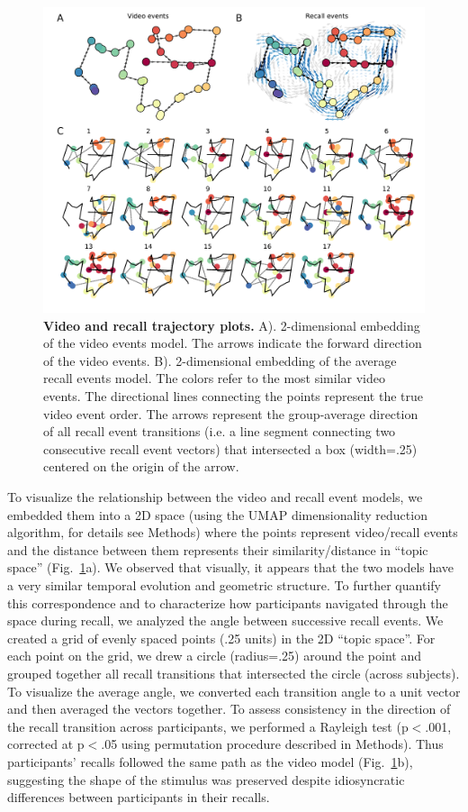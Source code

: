 \documentclass{article}
\begin{document}
{\begin{figure}[t!]
\centering
\includegraphics[width=1\textwidth]{figs/3_trajectory.pdf}
\caption{\small \textbf{Video and recall trajectory plots.} A). 2-dimensional embedding of the video events model. The arrows indicate the forward direction of the video events. B). 2-dimensional embedding of the average recall events model.  The colors refer to the most similar video events. The directional lines connecting the points represent the true video event order. The arrows represent the group-average direction of all recall event transitions (i.e. a line segment connecting two consecutive recall event vectors) that intersected a box (width=.25) centered on the origin of the arrow.}
\label{fig:trajectory}
\end{figure}

To visualize the relationship between the video and recall event models, we embedded them into a 2D space (using the UMAP dimensionality reduction algorithm, for details see Methods) where the points represent video/recall events and the distance between them represents their similarity/distance in ``topic space'' (Fig.~\ref{fig:trajectory}a).  We observed that visually, it appears that the two models have a very similar temporal evolution and geometric structure. To further quantify this correspondence and to characterize how participants navigated through the space during recall, we analyzed the angle between successive recall events. We created a grid of evenly spaced points (.25 units) in the 2D ``topic space''. For each point on the grid, we drew a circle (radius=.25) around the point and grouped together all recall transitions that intersected the circle (across subjects). To visualize the average angle, we converted each transition angle to a unit vector and then averaged the vectors together. To assess consistency in the direction of the recall transition across participants, we performed a Rayleigh test (p$<$.001, corrected at p$<$.05 using permutation procedure described in Methods). Thus participants' recalls followed the same path as the video model (Fig.~\ref{fig:trajectory}b), suggesting the shape of the stimulus was preserved despite idiosyncratic differences between participants in their recalls.

}
\end{document}
